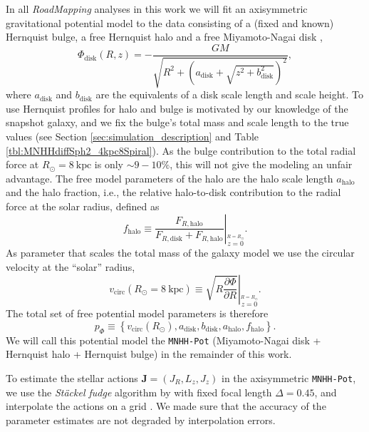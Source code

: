 \documentclass[iop,revtex4,numberedappendix,appendixfloats]{emulateapj}
\newcommand{\vect}[1]{\boldsymbol{#1}}
\newcommand{\RM}{{\sl RoadMapping}}
\begin{document}
In all \RM{} analyses in this work we will fit an axisymmetric gravitational potential model to the data consisting of a (fixed and known) Hernquist bulge, a free Hernquist halo and a free Miyamoto-Nagai disk \citep{1975PASJ...27..533M},
\begin{equation}
\Phi_\text{disk}(R,z) = - \frac{GM}{\sqrt{R^2+(a_\text{disk}+\sqrt{z^2+b_\text{disk}^2})^2}}, \label{eq:MN-disk}
\end{equation}
where $a_\text{disk}$ and $b_\text{disk}$ are the equivalents of a disk scale length and scale height. To use Hernquist profiles for halo and bulge is motivated by our knowledge of the snapshot galaxy, and we fix the bulge's total mass and scale length to the true values (see Section \ref{sec:simulation_description} and Table \ref{tbl:MNHHdiffSph2_4kpc8Spiral}). As the bulge contribution to the total radial force at $R_\odot=8~\text{kpc}$ is only $\sim9-10\%$, this will not give the modeling an unfair advantage. The free model parameters of the halo are the halo scale length $a_\text{halo}$ and the halo fraction, i.e., the relative halo-to-disk contribution to the radial force at the solar radius, defined as
\begin{equation}
f_\text{halo} \equiv \left. \frac{F_{R,\text{halo}}}{F_{R,\text{disk}} + F_{R,\text{halo}}} \right|_{\stackrel{R=R_\odot}{z=0}}.\label{eq:fhalo}
\end{equation}
As parameter that scales the total mass of the galaxy model we use the circular velocity at the ``solar'' radius,
\begin{equation}
v_\text{circ}(R_\odot=8~\text{kpc}) \equiv \left. \sqrt{ R \frac{\partial \Phi}{\partial R} }\right|_{\stackrel{R=R_\odot}{z=0}} . \label{eq:circvel}
\end{equation}  
The total set of free potential model parameters is therefore
\begin{equation}
p_\Phi \equiv \left\{ v_\text{circ}(R_\odot),a_\text{disk},b_\text{disk},a_\text{halo},f_\text{halo}\right\}.
\end{equation} 
We will call this potential model the \texttt{MNHH-Pot} (Miyamoto-Nagai disk + Hernquist halo + Hernquist bulge) in the remainder of this work.

To estimate the stellar actions $\vect{J}=(J_R,L_z,J_z)$ in the axisymmetric \texttt{MNHH-Pot}, we use the \emph{St\"{a}ckel fudge} algorithm by \citet{2012MNRAS.426.1324B} with fixed focal length $\Delta=0.45$, and interpolate the actions on a grid \citep{2012MNRAS.426.1324B,2015ApJS..216...29B}. We made sure that the accuracy of the parameter estimates are not degraded by interpolation errors.
\end{document}
